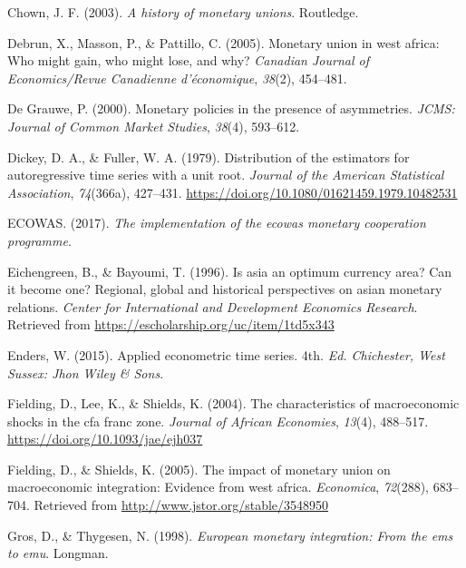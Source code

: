 \documentclass[]{article}
\begin{document}
\leavevmode\hypertarget{ref-chown2003history}{}%
Chown, J. F. (2003). \emph{A history of monetary unions}. Routledge.

\leavevmode\hypertarget{ref-debrun2005monetary}{}%
Debrun, X., Masson, P., \& Pattillo, C. (2005). Monetary union in west africa: Who might gain, who might lose, and why? \emph{Canadian Journal of Economics/Revue Canadienne d'économique}, \emph{38}(2), 454--481.

\leavevmode\hypertarget{ref-de2000monetary}{}%
De Grauwe, P. (2000). Monetary policies in the presence of asymmetries. \emph{JCMS: Journal of Common Market Studies}, \emph{38}(4), 593--612.

\leavevmode\hypertarget{ref-Dickey1979}{}%
Dickey, D. A., \& Fuller, W. A. (1979). Distribution of the estimators for autoregressive time series with a unit root. \emph{Journal of the American Statistical Association}, \emph{74}(366a), 427--431. \url{https://doi.org/10.1080/01621459.1979.10482531}

\leavevmode\hypertarget{ref-ECOWAS2017}{}%
ECOWAS. (2017). \emph{The implementation of the ecowas monetary cooperation programme}.

\leavevmode\hypertarget{ref-eichengreen1996asia}{}%
Eichengreen, B., \& Bayoumi, T. (1996). Is asia an optimum currency area? Can it become one? Regional, global and historical perspectives on asian monetary relations. \emph{Center for International and Development Economics Research}. Retrieved from \url{https://escholarship.org/uc/item/1td5x343}

\leavevmode\hypertarget{ref-enders2015applied}{}%
Enders, W. (2015). Applied econometric time series. 4th. \emph{Ed. Chichester, West Sussex: Jhon Wiley \& Sons}.

\leavevmode\hypertarget{ref-Fielding2004}{}%
Fielding, D., Lee, K., \& Shields, K. (2004). The characteristics of macroeconomic shocks in the cfa franc zone. \emph{Journal of African Economies}, \emph{13}(4), 488--517. \url{https://doi.org/10.1093/jae/ejh037}

\leavevmode\hypertarget{ref-Fielding2005}{}%
Fielding, D., \& Shields, K. (2005). The impact of monetary union on macroeconomic integration: Evidence from west africa. \emph{Economica}, \emph{72}(288), 683--704. Retrieved from \url{http://www.jstor.org/stable/3548950}

\leavevmode\hypertarget{ref-gros1998european}{}%
Gros, D., \& Thygesen, N. (1998). \emph{European monetary integration: From the ems to emu}. Longman.
\end{document}
